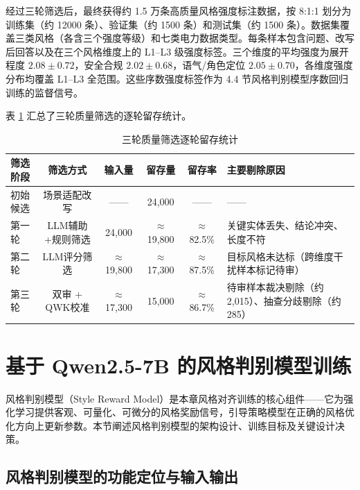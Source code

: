 \documentclass[fontset=fandol,type=master,campus=shenzhen,etitleauto=true]{hithesisbook}
\begin{document}
经过三轮筛选后，最终获得约 1.5 万条高质量风格强度标注数据，按 8:1:1 划分为训练集（约 12000 条）、验证集（约 1500 条）和测试集（约 1500 条）。数据集覆盖三类风格（各含三个强度等级）和七类电力数据类型。每条样本包含问题、改写后回答以及在三个风格维度上的 L1--L3 级强度标签。三个维度的平均强度为展开程度 $2.08 \pm 0.72$，安全合规 $2.02 \pm 0.68$，语气/角色定位 $2.05 \pm 0.70$，各维度强度分布均覆盖 L1--L3 全范围。这些序数强度标签作为 4.4 节风格判别模型序数回归训练的监督信号。

表 \ref{tab:style-data-dist} 汇总了三轮质量筛选的逐轮留存统计。

\begin{table}[htbp]
\centering
\caption{三轮质量筛选逐轮留存统计}
\label{tab:style-data-dist}
\small
\setlength{\tabcolsep}{4pt}
\renewcommand{\arraystretch}{1.1}
\begin{tabular}{l c c c c p{4.2cm}}
\toprule
\textbf{筛选阶段} & \textbf{筛选方式} & \textbf{输入量} & \textbf{留存量} & \textbf{留存率} & \textbf{主要剔除原因} \\
\midrule
初始候选   & 场景适配改写  &  ——   & 24{,}000 &  ——    &  —— \\
第一轮     & LLM辅助+规则筛选 & 24{,}000 & $\approx$19{,}800 & $\approx$82.5\% & 关键实体丢失、结论冲突、长度不符 \\
第二轮     & LLM评分筛选   & $\approx$19{,}800 & $\approx$17{,}300 & $\approx$87.5\% & 目标风格未达标（跨维度干扰样本标记待审） \\
第三轮     & 双审 + QWK校准 & $\approx$17{,}300 & 15{,}000 & $\approx$86.7\% & 待审样本裁决剔除（约 2{,}015）、抽查分歧剔除（约 285） \\
\bottomrule
\end{tabular}
\end{table}

\section{基于 Qwen2.5-7B 的风格判别模型训练}\label{ux57faux4e8e-qwen2.5-7b-ux7684ux98ceux683cux5224ux522bux6a21ux578bux8badux7ec3}

风格判别模型（Style Reward Model）是本章风格对齐训练的核心组件------它为强化学习提供客观、可量化、可微分的风格奖励信号，引导策略模型在正确的风格优化方向上更新参数。本节阐述风格判别模型的架构设计、训练目标及关键设计决策。

\subsection{风格判别模型的功能定位与输入输出}\label{ux98ceux683cux5224ux522bux6a21ux578bux7684ux529fux80fdux5b9aux4f4dux4e0eux8f93ux5165ux8f93ux51fa}
\end{document}
